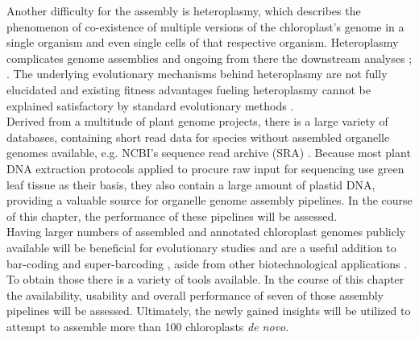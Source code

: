 Another difficulty for the assembly is heteroplasmy, which describes the phenomenon of
co-existence of multiple versions of the chloroplast's genome in a single organism and
even single cells of that respective organism. Heteroplasmy complicates genome assemblies
and ongoing from there the downstream analyses \cite{corriveau_1988}; \cite{Chat2002}. The
underlying evolutionary mechanisms behind heteroplasmy are not fully elucidated and
existing fitness advantages fueling heteroplasmy cannot be explained satisfactory by
standard evolutionary methods
\cite{Scar2016}. \\

Derived from a multitude of plant genome projects, there is a large variety of databases,
containing short read data for species without assembled organelle genomes available,
e.g. NCBI's sequence read archive (SRA) \cite{SRA2010}. Because most plant DNA extraction
protocols applied to procure raw input for sequencing use green leaf tissue as their
basis, they also contain a large amount of plastid DNA, providing a valuable source for
organelle genome assembly pipelines. In the course of this chapter, the performance of
these pipelines will be assessed.\\
Having larger numbers of assembled and annotated chloroplast genomes publicly available
will be beneficial for evolutionary studies and are a useful addition to bar-coding and
super-barcoding \cite{coissac_barcodes_2016}, aside from other biotechnological
applications \cite{daniell_chloroplast_2016}. To obtain those there is a variety of tools
available. In the course of this chapter the availability, usability and overall
performance of seven of those assembly pipelines will be assessed. Ultimately, the newly
gained insights will be utilized to attempt to assemble more than 100
chloroplasts \textit{de novo}.

